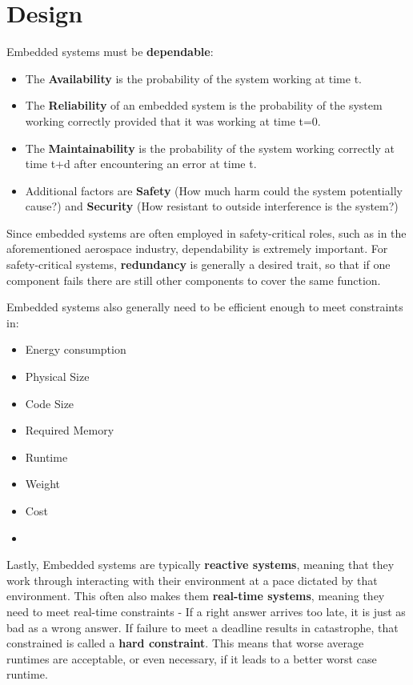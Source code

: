 \documentclass{report}
\newcommand{\tbf}{\textbf}
\newcommand*{\newpar}{\par\vspace{\baselineskip}\noindent} %
\begin{document}
\section{Design}
Embedded systems must be \tbf{dependable}:
\begin{itemize}
    \item The \tbf{Availability} is the probability of the system working at time t.
    \item The \tbf{Reliability} of an embedded system is the probability of the system working correctly provided that it was working at time t=0.
    \item The \tbf{Maintainability} is the probability of the system working correctly at time t+d after encountering an error at time t.
    \item Additional factors are \tbf{Safety} (How much harm could the system potentially cause?) and \tbf{Security} (How resistant to outside interference is the system?)
\end{itemize}
Since embedded systems are often employed in safety-critical roles, such as in the aforementioned aerospace industry, dependability is extremely important. For safety-critical systems, \tbf{redundancy} is generally a desired trait, so that if one component fails there are still other components to cover the same function.
\newpar
Embedded systems also generally need to be efficient enough to meet constraints in:
\begin{multicols}{2}
\begin{itemize}
    \item Energy consumption
    \item Physical Size
    \item Code Size
    \item Required Memory
    \item Runtime
    \item Weight
    \item Cost
    \item[\vspace{\fill}]
\end{itemize}
\end{multicols}
\newpar
Lastly, Embedded systems are typically \tbf{reactive systems}, meaning that they work through interacting with their environment at a pace dictated by that environment. This often also makes them \tbf{real-time systems}, meaning they need to meet real-time constraints - If a right answer arrives too late, it is just as bad as a wrong answer. If failure to meet a deadline results in catastrophe, that constrained is called a \tbf{hard constraint}. This means that worse average runtimes are acceptable, or even necessary, if it leads to a better worst case runtime. 
\end{document}
